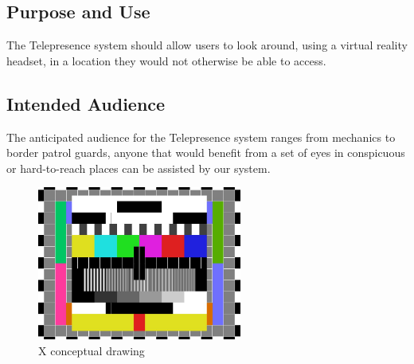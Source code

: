 
\subsection{Purpose and Use}
The Telepresence system should allow users to look around, using a virtual reality headset, in a location they would not otherwise be able to access.

\subsection{Intended Audience}
The anticipated audience for the Telepresence system ranges from mechanics to border patrol guards, anyone that would benefit from a set of eyes in conspicuous or hard-to-reach places can be assisted by our system.
\begin{figure}[h!]
	\centering
   	\includegraphics[width=0.60\textwidth]{images/test_image}
    \caption{X conceptual drawing}
\end{figure}
